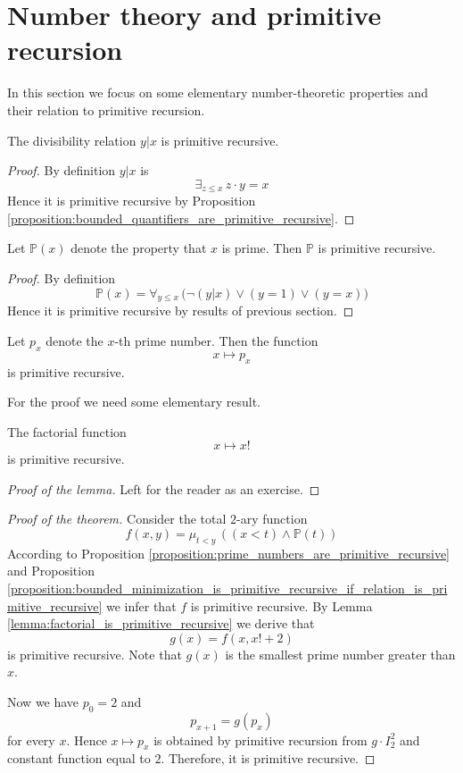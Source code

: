 \documentclass[10pt]{amsart}
\begin{document}
\section{Number theory and primitive recursion}
\noindent
In this section we focus on some elementary number-theoretic properties and their relation to primitive recursion.

\begin{proposition}\label{proposition:divisibility_is_primitive_recursive}
	The divisibility relation $y|x$ is primitive recursive.
\end{proposition}
\begin{proof}
	By definition $y|x$ is
	$$\exists_{z \leq x}\,z\cdot y = x$$
	Hence it is primitive recursive by Proposition \ref{proposition:bounded_quantifiers_are_primitive_recursive}.
\end{proof}

\begin{proposition}\label{proposition:prime_numbers_are_primitive_recursive}
	Let $\mathbb{P}(x)$ denote the property that $x$ is prime. Then $\mathbb{P}$ is primitive recursive.
\end{proposition}
\begin{proof}
	By definition
	$$\mathbb{P}(x) = \forall_{y \leq x}\,\big(\neg\left(y|x\right)\vee\left(y = 1\right)\vee \left(y = x\right)\big)$$
	Hence it is primitive recursive by results of previous section.
\end{proof}

\begin{theorem}\label{theorem:prime_sequence_is_primitive_recursive}
	Let $p_x$ denote the $x$-th prime number. Then the function
	$$x \mapsto p_x$$
	is primitive recursive.
\end{theorem}
\noindent
For the proof we need some elementary result.

\begin{lemma}\label{lemma:factorial_is_primitive_recursive}
	The factorial function
	$$x \mapsto x!$$
	is primitive recursive.
\end{lemma}
\begin{proof}[Proof of the lemma]
	Left for the reader as an exercise.
\end{proof}

\begin{proof}[Proof of the theorem]
	Consider the total $2$-ary function
	$$f(x, y) = \mu_{t < y}\,\left(\left(x < t\right)\wedge \mathbb{P}(t)\right)$$
	According to Proposition \ref{proposition:prime_numbers_are_primitive_recursive} and Proposition \ref{proposition:bounded_minimization_is_primitive_recursive_if_relation_is_primitive_recursive} we infer that $f$ is primitive recursive. By Lemma \ref{lemma:factorial_is_primitive_recursive} we derive that
	$$g(x) = f(x,x!+2)$$
	is primitive recursive. Note that $g(x)$ is the smallest prime number greater than $x$.

	Now we have $p_0 = 2$ and
	$$p_{x+1} = g(p_x)$$
	for every $x$. Hence $x \mapsto p_x$ is obtained by primitive recursion from $g\cdot I^2_2$ and constant function equal to $2$. Therefore, it is primitive recursive.
\end{proof}
\end{document}
